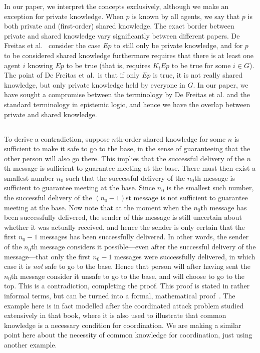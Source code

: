 In our paper, we interpret the concepts exclusively, although we make an exception for private knowledge. When $p$ is known by all agents, we say that $p$ is both private and (first-order) shared knowledge. The exact border between private and shared knowledge vary significantly between different papers. De Freitas et al.~\cite{de2019common} consider the case $E p$ to still only be private knowledge, and for $p$ to be considered shared knowledge furthermore requires that there is at least one agent $i$ knowing $E p$ to be true (that is, requires $K_i E p$ to be true for some $i \in G$). The point of De Freitas et al.\ is that if only $E p$ is true, it is not really shared knowledge, but only private knowledge held by everyone in $G$. In our paper, we have sought a compromise between the terminology by De Freitas et al. and the standard terminology in epistemic logic, and hence we have the overlap between private and shared knowledge.

\subsection{}
\label{app:trekking-proof}
 To derive a contradiction, suppose $n$th-order shared knowledge for some $n$ is sufficient to make it safe to go to the base, in the sense of guaranteeing that the other person will also go there. This implies that the successful delivery of the $n$th message is sufficient to guarantee meeting at the base. There must then exist a smallest number $n_0$ such that the successful delivery of the $n_0$th message is sufficient to guarantee meeting at the base. Since $n_0$ is the smallest such number, the successful delivery of the $(n_0-1)$st message is not sufficient to guarantee meeting at the base. Now note that at the moment when the $n_0$th message has been successfully delivered, the sender of this message is still uncertain about whether it was actually received, and hence the sender is only certain that the first $n_0-1$ messages has been successfully delivered.  In other words, the sender of the $n_0$th message considers it possible---even after the successful delivery of the message---that only the first $n_0-1$ messages were successfully delivered, in which case it is \emph{not} safe to go to the base. Hence that person will after having sent the $n_0$th message  consider it unsafe to go to the base, and will choose to go to the top. This is a contradiction, completing the proof. This proof is stated in rather informal terms, but can be turned into a formal, mathematical proof~\cite{fagin1995reasoning}. The example here is in fact modelled after the coordinated attack problem studied extensively in that book, where it is also used to illustrate that common knowledge is a necessary condition for coordination. We are making a similar point here about the necessity of common knowledge for coordination, just using another example.


